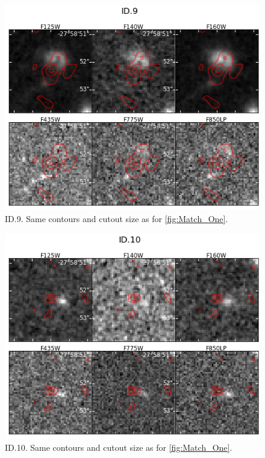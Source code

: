 \begin{figure}[tbp]
\centering \includegraphics[width=160mm]{Matched/ASPECS_Cutout_8.jpg}
\caption{ID.9. Same contours and cutout size as for \ref{fig:Match_One}.}
\label{fig:Match_Three}
\end{figure}

\begin{figure}[tbp]
\centering \includegraphics[width=160mm]{Matched/ASPECS_Cutout_9.jpg}
\caption{ID.10. Same contours and cutout size as for \ref{fig:Match_One}.}
\label{fig:Match_Three}
\end{figure}


